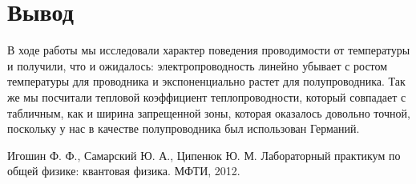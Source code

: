 \documentclass[a4paper, 12pt]{article}%
\begin{document}
\section{Вывод}
В ходе работы мы исследовали характер поведения проводимости от температуры и получили, что и ожидалось: электропроводность линейно убывает с ростом температуры для проводника и экспоненциально растет для полупроводника. Так же мы посчитали тепловой коэффициент теплопроводности, который совпадает с табличным, как и ширина запрещенной зоны, которая оказалось довольно точной, поскольку у нас в качестве полупроводника был использован Германий.
\begin{thebibliography}{3}
Игошин Ф. Ф., Самарский Ю. А., Ципенюк Ю. М. Лабораторный практикум по общей физике: квантовая физика. МФТИ, 2012.
\end{thebibliography}
\end{document}
